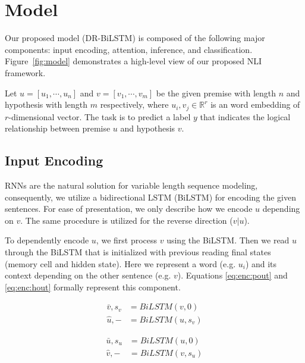 \documentclass[11pt,a4paper]{article}
\begin{document}
	\section{Model}
	Our proposed model (DR-BiLSTM) is composed of the following major components: input encoding, attention, inference, and classification. Figure~\ref{fig:model} demonstrates a high-level view of our proposed NLI framework. 
	
	Let $u=[u_1, \cdots, u_n]$ and $v=[v_1, \cdots, v_m]$ be the given premise with length $n$ and hypothesis with length $m$ respectively, where $u_i, v_j \in \mathbb{R}^r$ is an word embedding of $r$-dimensional vector. The task is to predict a label $y$ that indicates the logical relationship between premise $u$ and hypothesis $v$.
	
	\subsection{Input Encoding}
	\label{sec:enc}
	
	RNNs are the natural solution for variable length sequence modeling, consequently, we utilize a bidirectional LSTM (BiLSTM) \cite{lstm} for encoding the given sentences. For ease of presentation, we only describe how we encode $u$ depending on $v$. The same procedure is utilized for the reverse direction ($v|u$). 
	
	To dependently encode $u$, we first process $v$ using the BiLSTM. Then we read $u$ through the BiLSTM that is initialized with previous reading final states (memory cell and hidden state). Here we represent a word (e.g. $u_i$) and its context depending on the other sentence (e.g. $v$).  Equations \ref{eq:enc:pout} and \ref{eq:enc:hout} formally represent this component.
	
	\begin{equation}
	\begin{split}
	\bar{v}, s_v &= \textit{BiLSTM}(v, 0) \\
	\hat{u}, - &= \textit{BiLSTM}(u, s_v)
	\end{split}
	\label{eq:enc:pout}
	\end{equation}
	
	\begin{equation}
	\begin{split}
	\bar{u}, s_u &= \textit{BiLSTM}(u, 0) \\
	\hat{v}, - &= \textit{BiLSTM}(v, s_u)
	\end{split}
	\label{eq:enc:hout}
	\end{equation}
	
\end{document}
